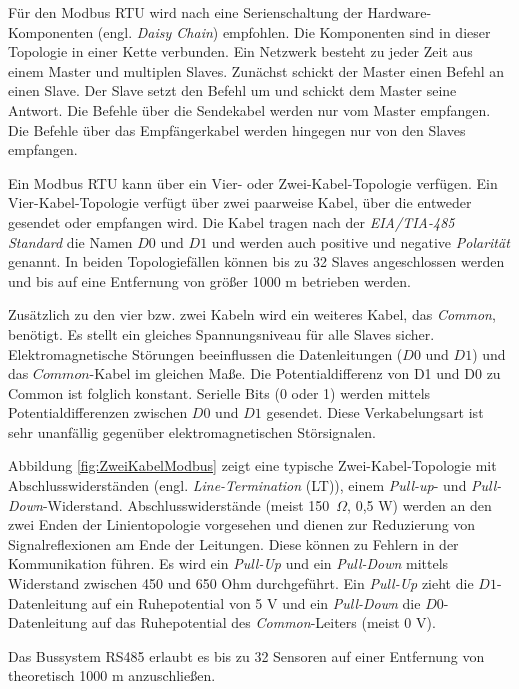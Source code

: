 Für den Modbus RTU wird nach \citep{MODBUS.ORG2002} eine Serienschaltung der Hardware-Komponenten (engl. \textit{Daisy Chain}) empfohlen. Die Komponenten sind in dieser Topologie in einer Kette verbunden. Ein Netzwerk besteht zu jeder Zeit aus einem Master und multiplen Slaves. Zunächst schickt der Master einen Befehl an einen Slave. Der Slave setzt den Befehl um und schickt dem Master seine Antwort. Die Befehle über die Sendekabel werden nur vom Master empfangen. Die Befehle über das Empfängerkabel werden hingegen nur von den Slaves empfangen.
 
Ein Modbus RTU kann über ein Vier- oder Zwei-Kabel-Topologie verfügen. Ein Vier-Kabel-Topologie verfügt über zwei paarweise Kabel, über die entweder gesendet oder empfangen wird. Die Kabel tragen nach der \textit{EIA/TIA-485 Standard} die Namen $D0$ und $D1$ und werden auch positive und negative \textit{Polarität} genannt. In beiden Topologiefällen können bis zu 32 Slaves angeschlossen werden und bis auf eine Entfernung von größer 1000 m betrieben werden. 

Zusätzlich zu den vier bzw. zwei Kabeln wird ein weiteres Kabel, das \textit{Common}, benötigt. Es stellt ein gleiches Spannungsniveau für alle Slaves sicher. Elektromagnetische Störungen beeinflussen die Datenleitungen ($D0$ und $D1$) und das $Common$-Kabel im gleichen Maße. Die Potentialdifferenz von D1 und D0 zu Common ist folglich konstant. Serielle Bits (0 oder 1) werden mittels Potentialdifferenzen zwischen $D0$ und $D1$ gesendet. Diese Verkabelungsart ist sehr unanfällig gegenüber elektromagnetischen Störsignalen. 

Abbildung \ref{fig:ZweiKabelModbus} zeigt eine typische Zwei-Kabel-Topologie mit Abschlusswiderständen (engl. \textit{Line-Termination} (LT)), einem \textit{Pull-up}- und \textit{Pull-Down}-Widerstand.  Abschlusswiderstände (meist \mbox{150 $\Omega$}, 0,5 W) werden an den zwei Enden der Linientopologie vorgesehen und dienen zur Reduzierung von Signalreflexionen am Ende der Leitungen. Diese können zu Fehlern in der Kommunikation führen. 
Es wird ein \textit{Pull-Up} und ein \textit{Pull-Down} mittels Widerstand zwischen 450 und 650 Ohm durchgeführt. Ein \textit{Pull-Up} zieht die $D1$-Datenleitung auf ein Ruhepotential von 5 V und ein \textit{Pull-Down} die $D0$-Datenleitung auf das Ruhepotential des \textit{Common}-Leiters (meist 0 V).

Das Bussystem RS485 erlaubt es bis zu 32 Sensoren auf einer Entfernung von theoretisch 1000 m anzuschließen.



